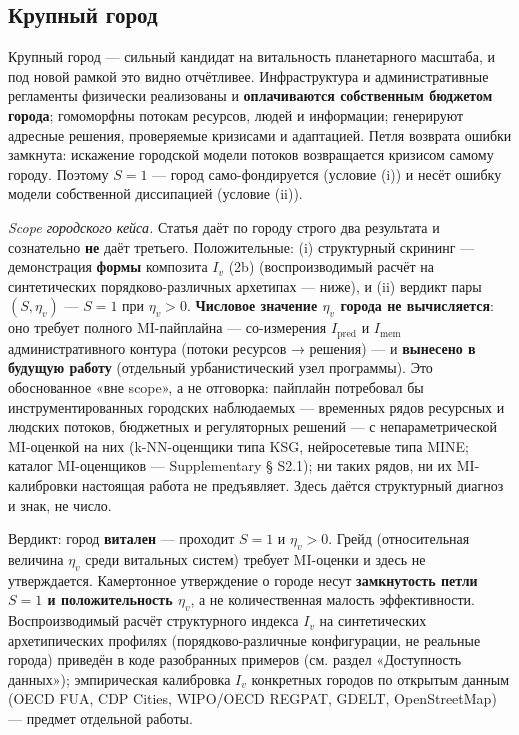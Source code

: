 \documentclass[pdflatex,sn-mathphys-ay]{sn-jnl}
\begin{document}
\subsection{Крупный город}\label{ux43aux440ux443ux43fux43dux44bux439-ux433ux43eux440ux43eux434}

Крупный город --- сильный кандидат на витальность планетарного масштаба, и под новой рамкой это видно отчётливее. Инфраструктура и административные регламенты физически реализованы и \textbf{оплачиваются собственным бюджетом города}; гомоморфны потокам ресурсов, людей и информации; генерируют адресные решения, проверяемые кризисами и адаптацией. Петля возврата ошибки замкнута: искажение городской модели потоков возвращается кризисом самому городу. Поэтому \(S = 1\) --- город само-фондируется (условие (i)) и несёт ошибку модели собственной диссипацией (условие (ii)).

\emph{Scope городского кейса.} Статья даёт по городу строго два результата и сознательно \textbf{не} даёт третьего. Положительные: (i) структурный скрининг --- демонстрация \textbf{формы} композита \(I_v\) (2b) (воспроизводимый расчёт на синтетических порядково-различных архетипах --- ниже), и (ii) вердикт пары \((S, \eta_v)\) --- \(S = 1\) при \(\eta_v > 0\). \textbf{Числовое значение \(\eta_v\) города не вычисляется}: оно требует полного MI-пайплайна --- со-измерения \(I_{\text{pred}}\) и \(I_{\text{mem}}\) административного контура (потоки ресурсов → решения) --- и \textbf{вынесено в будущую работу} (отдельный урбанистический узел программы). Это обоснованное «вне scope», а не отговорка: пайплайн потребовал бы инструментированных городских наблюдаемых --- временных рядов ресурсных и людских потоков, бюджетных и регуляторных решений --- с непараметрической MI-оценкой на них (k-NN-оценщики типа KSG, нейросетевые типа MINE; каталог MI-оценщиков --- Supplementary § S2.1); ни таких рядов, ни их MI-калибровки настоящая работа не предъявляет. Здесь даётся структурный диагноз и знак, не число.

Вердикт: город \textbf{витален} --- проходит \(S = 1\) и \(\eta_v > 0\). Грейд (относительная величина \(\eta_v\) среди витальных систем) требует MI-оценки и здесь не утверждается. Камертонное утверждение о городе несут \textbf{замкнутость петли \(S = 1\) и положительность \(\eta_v\)}, а не количественная малость эффективности. Воспроизводимый расчёт структурного индекса \(I_v\) на синтетических архетипических профилях (порядково-различные конфигурации, не реальные города) приведён в коде разобранных примеров (см. раздел «Доступность данных»); эмпирическая калибровка \(I_v\) конкретных городов по открытым данным (OECD FUA, CDP Cities, WIPO/OECD REGPAT, GDELT, OpenStreetMap) --- предмет отдельной работы.
\end{document}
